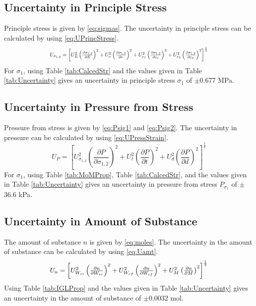 \documentclass[10pt,journal,letterpaper]{IEEEtran}
\begin{document}
\subsection*{Uncertainty in Principle Stress}

Principle stress is given by \eqref{eq:sigmas}.
The uncertainty in principle stress can be calculated by using \eqref{eq:UPrincStress}.
\begin{equation}
\label{eq:UPrincStress}
\resizebox{227pt}{!}{$U_{\sigma_{1,2}}=\left[U_{E}^2 \left(\frac{\partial \sigma_{1,2}}{\partial E}\right)^2 + U_{\nu}^2 \left(\frac{\partial \sigma_{1,2}}{\partial \nu}\right)^2 + U_{\varepsilon_1}^2 \left(\frac{\partial \sigma_{1,2}}{\partial \varepsilon_1}\right)^2 + U_{\varepsilon_2}^2 \left(\frac{\partial \sigma_{1,2}}{\partial \varepsilon_2}\right)^2 \right]^{\frac{1}{2}}$}
\end{equation}
For $\sigma_1$, using Table \ref{tab:CalcedStr} and the values given in Table \ref{tab:Uncertainty} gives an uncertainty in principle stress $\sigma_1$ of $\pm$0.677 MPa.

\subsection*{Uncertainty in Pressure from Stress}

Pressure from stress is given by \eqref{eq:Psig1} and \eqref{eq:Psig2}.
The uncertainty in pressure can be calculated by using \eqref{eq:UPressStrain}.
\begin{equation}
\label{eq:UPressStrain}
U_{P}=\left[U_{\sigma_{1,2}}^2 \left(\frac{\partial P}{\partial \sigma_{1,2}}\right)^2 + U_{t}^2 \left(\frac{\partial P}{\partial t}\right)^2 + U_{d}^2 \left(\frac{\partial P}{\partial d}\right)^2 \right]^{\frac{1}{2}}
\end{equation}
For $\sigma_1$, using Table \ref{tab:MoMProp}, Table \ref{tab:CalcedStr}, and the values given in Table \ref{tab:Uncertainty} gives an uncertainty in pressure from stress $P_{\sigma_1}$ of $\pm$36.6 kPa.

\subsection*{Uncertainty in Amount of Substance}

The amount of substance $n$ is given by \eqref{eq:moles}.
The uncertainty in the amount of substance can be calculated by using \eqref{eq:Uamt}.
\begin{equation}
\label{eq:Uamt}
\resizebox{227pt}{!}{$U_{n}=\left[U_{W_{ci}}^2 \left(\frac{\partial n}{\partial W_{ci}}\right)^2 + U_{W_{cf}}^2 \left(\frac{\partial n}{\partial W_{cf}}\right)^2 + U_{M}^2 \left(\frac{\partial n}{\partial M}\right)^2 \right]^{\frac{1}{2}}$}
\end{equation}
Using Table \ref{tab:IGLProp} and the values given in Table \ref{tab:Uncertainty} gives an uncertainty in the amount of substance of $\pm$0.0032 mol.
\end{document}
